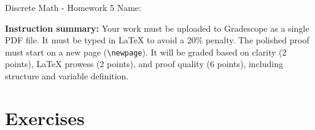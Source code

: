 \documentclass[12pt]{article}
\begin{document}
\begin{center}
    {\LARGE Discrete Math - Homework 5} \Large \newline
    Name:
\end{center}

\vspace{1em}

\noindent \textbf{Instruction summary:} Your work must be uploaded to Gradescope as a single PDF file. It must be typed in LaTeX to avoid a 20\% penalty. The polished proof must start on a new page (\texttt{\textbackslash newpage}). It will be graded based on clarity (2 points), LaTeX prowess (2 points), and proof quality (6 points), including structure and variable definition.

\section*{Exercises}
\end{document}
